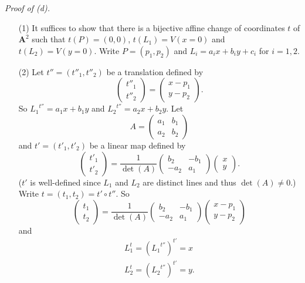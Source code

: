 \documentclass{article}
\begin{document}
\emph{Proof of (d).}
\begin{enumerate}
\item[(1)]
  It suffices to show that there is a bijective affine change of coordinates $t$ of $\mathbf{A}^{2}$
  such that $t(P) = (0,0)$, $t(L_1) = V(x = 0)$ and $t(L_2) = V(y = 0)$.
  Write $P = (p_1, p_2)$ and $L_i = a_i x + b_i y + c_i$ for $i = 1, 2$.

\item[(2)]
  Let $t'' = (t''_1, t''_2)$ be a translation defined by
  \[
    \begin{pmatrix}
      t''_1 \\
      t''_2
    \end{pmatrix}
    = \begin{pmatrix}
        x - p_1 \\
        y - p_2
      \end{pmatrix}.
  \]
  So ${L_1}^{t''} = a_1 x + b_1 y$ and ${L_2}^{t''} = a_2 x + b_2 y$.
  Let
  \[
    A = \begin{pmatrix}
      a_1 & b_1 \\
      a_2 & b_2
    \end{pmatrix}
  \]
  and $t' = (t'_1, t'_2)$ be a linear map defined by
  \[
    \begin{pmatrix}
      t'_1 \\
      t'_2
    \end{pmatrix}
    = \frac{1}{\det(A)}
      \begin{pmatrix}
        b_2 & -b_1 \\
        -a_2 & a_1
      \end{pmatrix}
      \begin{pmatrix}
        x \\
        y
      \end{pmatrix}.
  \]
  ($t'$ is well-defined since $L_1$ and $L_2$ are distinct lines and thus $\det(A) \neq 0$.)
  Write $t = (t_1, t_2) = t' \circ t''$.
  So
  \[
    \begin{pmatrix}
      t_1 \\
      t_2
    \end{pmatrix}
    = \frac{1}{\det(A)}
      \begin{pmatrix}
        b_2 & -b_1 \\
        -a_2 & a_1
      \end{pmatrix}
      \begin{pmatrix}
        x - p_1 \\
        y - p_2
      \end{pmatrix}
  \]
  and
  \begin{align*}
    L_1^{t} = ({L_1}^{t''})^{t'} = x \\
    L_2^{t} = ({L_2}^{t''})^{t'} = y.
  \end{align*}


\end{enumerate}
\end{document}

